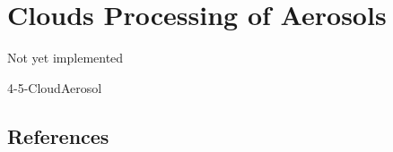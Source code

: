 \chapter{Clouds Processing of Aerosols}
\minitoc
%
Not yet implemented

%

\begin{btSect}{4-5-CloudAerosol}
\section{References}
\btPrintCited
\end{btSect}
